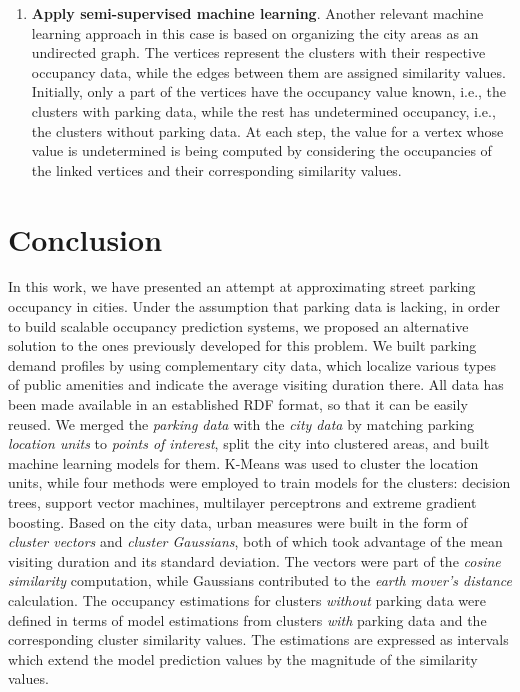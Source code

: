 \begin{enumerate}
	\item \textbf{Apply semi-supervised machine learning}.
Another relevant machine learning approach in this case is based on organizing the city areas as an undirected graph.
The vertices represent the clusters with their respective occupancy data, while the edges between them are assigned similarity values.
Initially, only a part of the vertices have the occupancy value known, i.e., the clusters with parking data, while the rest has undetermined occupancy, i.e., the clusters without parking data.
At each step, the value for a vertex whose value is undetermined is being computed by considering the occupancies of the linked vertices and their corresponding similarity values.
\end{enumerate} 

\section{Conclusion}
In this work, we have presented an attempt at approximating street parking occupancy in cities.
Under the assumption that parking data is lacking, in order to build scalable occupancy prediction systems, we proposed an alternative solution to the ones previously developed for this problem.
We built parking demand profiles by using complementary city data, which localize various types of public amenities and indicate the average visiting duration there.
All data has been made available in an established RDF format, so that it can be easily reused.
We merged the \textit{parking data} with the \textit{city data} by matching parking \textit{location units} to \textit{points of interest}, split the city into clustered areas, and built machine learning models for them.
K-Means was used to cluster the location units, while four methods were employed to train models for the clusters: decision trees, support vector machines, multilayer perceptrons and extreme gradient boosting.
Based on the city data, urban measures were built in the form of \textit{cluster vectors} and \textit{cluster Gaussians}, both of which took advantage of the mean visiting duration and its standard deviation.
The vectors were part of the \textit{cosine similarity} computation, while Gaussians contributed to the \textit{earth mover's distance} calculation.
The occupancy estimations for clusters \textit{without} parking data were defined in terms of model estimations from clusters \textit{with} parking data and the corresponding cluster similarity values.
The estimations are expressed as intervals which extend the model prediction values by the magnitude of the similarity values. 

